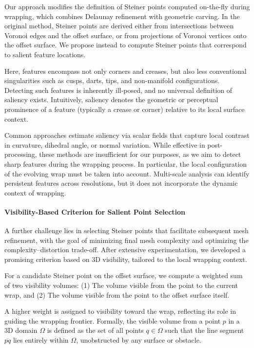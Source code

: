 Our approach modifies the definition of Steiner points computed on-the-fly during wrapping, which combines Delaunay refinement with geometric carving. In the original method, Steiner points are derived either from intersections between Voronoi edges and the offset surface, or from projections of Voronoi vertices onto the offset surface. We propose instead to compute Steiner points that correspond to salient feature locations.

Here, features encompass not only corners and creases, but also less conventional singularities such as cusps, darts, tips, and non-manifold configurations. Detecting such features is inherently ill-posed, and no universal definition of saliency exists. Intuitively, saliency denotes the geometric or perceptual prominence of a feature (typically a crease or corner) relative to its local surface context.

Common approaches estimate saliency via scalar fields that capture local contrast in curvature, dihedral angle, or normal variation. While effective in post-processing, these methods are insufficient for our purposes, as we aim to detect sharp features during the wrapping process. In particular, the local configuration of the evolving wrap must be taken into account. Multi-scale analysis can identify persistent features across resolutions, but it does not incorporate the dynamic context of wrapping.

\paragraph{Visibility-Based Criterion for Salient Point Selection}

A further challenge lies in selecting Steiner points that facilitate subsequent mesh refinement, with the goal of minimizing final mesh complexity and optimizing the complexity–distortion trade-off. After extensive experimentation, we developed a promising criterion based on 3D visibility, tailored to the local wrapping context.

For a candidate Steiner point on the offset surface, we compute a weighted sum of two visibility volumes: (1) The volume visible from the point to the current wrap, and (2) The volume visible from the point to the offset surface itself.


A higher weight is assigned to visibility toward the wrap, reflecting its role in guiding the wrapping frontier. Formally, the visible volume from a point $p$ in a 3D domain $\Omega$ is defined as the set of all points $q \in \Omega$ such that the line segment $\overline{pq}$ lies entirely within $\Omega$, unobstructed by any surface or obstacle.

